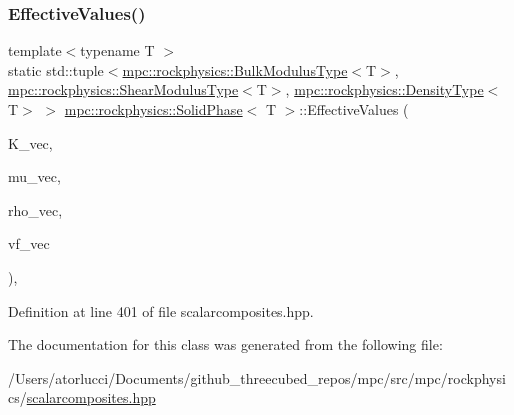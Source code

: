 \subsubsection{\texorpdfstring{Effective\+Values()}{EffectiveValues()}}
{\footnotesize\ttfamily template$<$typename T $>$ \\
static std\+::tuple$<$\mbox{\hyperlink{structmpc_1_1rockphysics_1_1_bulk_modulus_type}{mpc\+::rockphysics\+::\+Bulk\+Modulus\+Type}}$<$T$>$, \mbox{\hyperlink{structmpc_1_1rockphysics_1_1_shear_modulus_type}{mpc\+::rockphysics\+::\+Shear\+Modulus\+Type}}$<$T$>$, \mbox{\hyperlink{structmpc_1_1rockphysics_1_1_density_type}{mpc\+::rockphysics\+::\+Density\+Type}}$<$T$>$ $>$ \mbox{\hyperlink{classmpc_1_1rockphysics_1_1_solid_phase}{mpc\+::rockphysics\+::\+Solid\+Phase}}$<$ T $>$\+::Effective\+Values (\begin{DoxyParamCaption}\item[{const std\+::vector$<$ \mbox{\hyperlink{structmpc_1_1rockphysics_1_1_bulk_modulus_type}{mpc\+::rockphysics\+::\+Bulk\+Modulus\+Type}}$<$ T $>$ $>$ \&}]{K\+\_\+vec,  }\item[{const std\+::vector$<$ \mbox{\hyperlink{structmpc_1_1rockphysics_1_1_shear_modulus_type}{mpc\+::rockphysics\+::\+Shear\+Modulus\+Type}}$<$ T $>$ $>$ \&}]{mu\+\_\+vec,  }\item[{const std\+::vector$<$ \mbox{\hyperlink{structmpc_1_1rockphysics_1_1_density_type}{mpc\+::rockphysics\+::\+Density\+Type}}$<$ T $>$ $>$ \&}]{rho\+\_\+vec,  }\item[{const std\+::vector$<$ \mbox{\hyperlink{structmpc_1_1rockphysics_1_1_volume_fraction_type}{mpc\+::rockphysics\+::\+Volume\+Fraction\+Type}}$<$ T $>$ $>$ \&}]{vf\+\_\+vec }\end{DoxyParamCaption})\hspace{0.3cm}{\ttfamily [inline]}, {\ttfamily [static]}}



Definition at line 401 of file scalarcomposites.\+hpp.



The documentation for this class was generated from the following file\+:\begin{DoxyCompactItemize}
\item 
/\+Users/atorlucci/\+Documents/github\+\_\+threecubed\+\_\+repos/mpc/src/mpc/rockphysics/\mbox{\hyperlink{scalarcomposites_8hpp}{scalarcomposites.\+hpp}}\end{DoxyCompactItemize}

